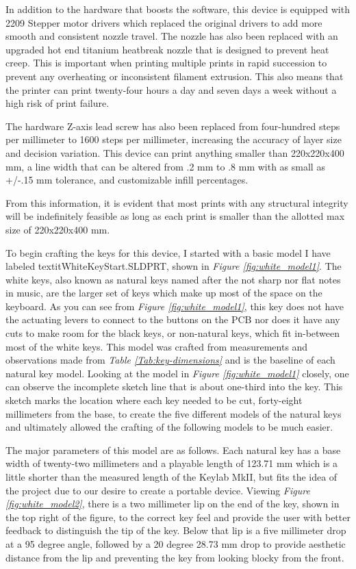 In addition to the hardware that boosts the software, this device is equipped with 2209 Stepper motor drivers which replaced the original drivers to add more smooth and consistent nozzle travel. The nozzle has also been replaced with an upgraded hot end titanium heatbreak nozzle that is designed to prevent heat creep. This is important when printing multiple prints in rapid succession to prevent any overheating or inconsistent filament extrusion. This also means that the printer can print twenty-four hours a day and seven days a week without a high risk of print failure.

The hardware Z-axis lead screw has also been replaced from four-hundred steps per millimeter to 1600 steps per millimeter, increasing the accuracy of layer size and decision variation. This device can print anything smaller than 220x220x400 mm, a line width that can be altered from .2 mm to .8 mm with as small as +/-.15 mm tolerance, and customizable infill percentages.

From this information, it is evident that most prints with any structural integrity will be indefinitely feasible as long as each print is smaller than the allotted max size of 220x220x400 mm.

To begin crafting the keys for this device, I started with a basic model I have labeled textit{WhiteKeyStart.SLDPRT}, shown in \textit{Figure \ref{fig:white_model1}}. The white keys, also known as natural keys named after the not sharp nor flat notes in music, are the larger set of keys which make up most of the space on the keyboard. As you can see from \textit{Figure \ref{fig:white_model1}}, this key does not have the actuating levers to connect to the buttons on the PCB nor does it have any cuts to make room for the black keys, or non-natural keys, which fit in-between most of the white keys. This model was crafted from measurements and observations made from \textit{Table \ref{Tab:key-dimensions}} and is the baseline of each natural key model. Looking at the model in \textit{Figure \ref{fig:white_model1}} closely, one can observe the incomplete sketch line that is about one-third into the key. This sketch marks the location where each key needed to be cut, forty-eight millimeters from the base, to create the five different models of the natural keys and ultimately allowed the crafting of the following models to be much easier.

The major parameters of this model are as follows. Each natural key has a base width of twenty-two millimeters and a playable length of 123.71 mm which is a little shorter than the measured length of the Keylab MkII, but fits the idea of the project due to our desire to create a portable device. Viewing \textit{Figure \ref{fig:white_model2}}, there is a two millimeter lip on the end of the key, shown in the top right of the figure, to the correct key feel and provide the user with better feedback to distinguish the tip of the key. Below that lip is a five millimeter drop at a 95 degree angle, followed by a 20 degree 28.73 mm drop to provide aesthetic distance from the lip and preventing the key from looking blocky from the front.

